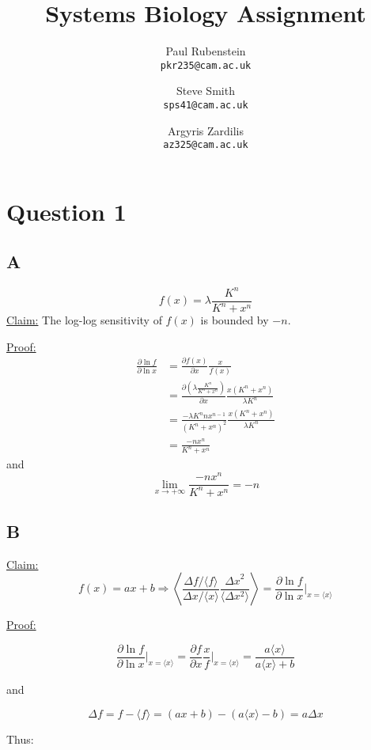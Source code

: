 \documentclass[a4paper,12pt]{article}
\author{Paul Rubenstein\\ \texttt{pkr235@cam.ac.uk} \and Steve Smith \\ \texttt{sps41@cam.ac.uk} \and Argyris Zardilis \\ \texttt{az325@cam.ac.uk}}
\title{Systems Biology Assignment}
\begin{document}
\maketitle

\section*{Question 1}
\subsection*{A}
\[f(x) = \lambda \frac{K^n}{K^n + x^n}\]
\underline{Claim:} The log-log sensitivity of $f(x)$ is bounded by $-n$.

\noindent \underline{Proof:} 
\begin{align*}
\frac{\partial \ln f}{\partial \ln x} & =  \frac{\partial f(x)}{\partial x}\frac{x}{f(x)} \\
& = \frac{\partial (\lambda \frac{K^n}{K^n + x^n})}{\partial x} \frac{x(K^n + x^n)}{\lambda K^n} \\
& = \frac{- \lambda K^n n x^{n-1}}{(K^n + x^n)^2} \frac{x(K^n + x^n)}{\lambda K^n} \\
& = \frac{-n x^n}{K^n + x^n}
\end{align*}
and
\begin{equation*}
\lim_{x \to +\infty} \frac{-n x^n}{K^n + x^n} = -n
\end{equation*}



\subsection*{B}

\underline{Claim:} \[f(x) = a x+b \Rightarrow \left \langle \frac{\Delta f / \langle f \rangle}{\Delta x / \langle x \rangle}  \frac{{\Delta x}^2}{\langle \Delta x^2 \rangle} \right \rangle = \frac{\partial \ln f}{\partial \ln x} \bigg|_{x=\langle x \rangle} \]

\noindent \underline{Proof:}

\[ \frac{\partial \ln f}{\partial \ln x} \bigg|_{x=\langle x \rangle} = \frac{\partial f}{\partial x} \frac{x}{f} \bigg|_{x=\langle x \rangle} = \frac{a\langle x \rangle}{a \langle x \rangle + b}\]

and

\[ \Delta f = f - \langle f \rangle = (ax+b) - (a \langle x \rangle - b) = a \Delta x\]

Thus:
\end{document}
